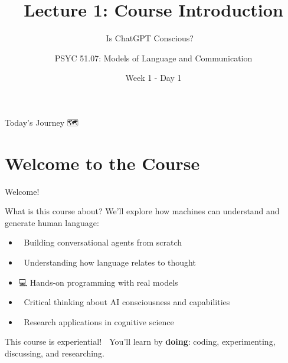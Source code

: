 \documentclass[aspectratio=169]{beamer}
\title{Lecture 1: Course Introduction}
\subtitle{Is ChatGPT Conscious? 🤖💭}
\author{PSYC 51.07: Models of Language and Communication}
\institute{Dr. Jeremy R. Manning}
\date{Week 1 - Day 1}
\begin{document}
\begin{frame}[shrink=10]
\titlepage
\end{frame}

\begin{frame}[shrink=5]{Today's Journey 🗺️}
\tableofcontents
\end{frame}

\section{Welcome to the Course}

\begin{frame}{Welcome! 👋}
\small
\begin{block}{What is this course about?}
We'll explore how machines can understand and generate human language:
\begin{itemize}\setlength{\itemsep}{0pt}
    \item 🤖 Building conversational agents from scratch
    \item 🧠 Understanding how language relates to thought
    \item 💻 Hands-on programming with real models
    \item 🤔 Critical thinking about AI consciousness and capabilities
    \item 🔬 Research applications in cognitive science
\end{itemize}
\end{block}

\vspace{0.3cm}

\begin{alertblock}{This course is experiential! 🎯}
You'll learn by \textbf{doing}: coding, experimenting, discussing, and researching.
\end{alertblock}
\end{frame}
\end{document}
